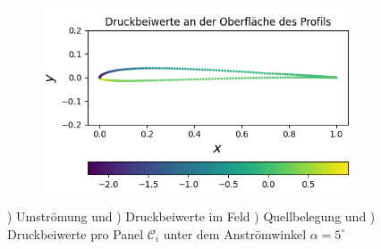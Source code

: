 \begin{figure}[!ht]
\begin{subfigure}[b]{0.475\linewidth}
    \caption{\label{fig:zoneq}}
  \end{subfigure}
  \hfill
  \begin{subfigure}[b]{0.475\linewidth}
    \centering\includegraphics[scale=0.5]{figures/z40cp.png} 
    \caption{\label{fig:zonecp}}
  \end{subfigure}
  
  \caption{) Umströmung und ) Druckbeiwerte im Feld ) Quellbelegung und ) Druckbeiwerte pro Panel $\mathcal{C}_{i}$ unter dem Anströmwinkel $\alpha =5^{\circ}$}
\end{figure}


\newpage
